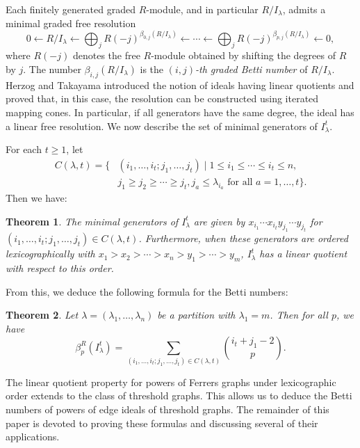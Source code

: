 \documentclass[12pt,amscd]{amsart}
\newtheorem{thm}{Theorem}[section]
\theoremstyle{definition}
\numberwithin{equation}{section}
\begin{document}
Each finitely generated graded $R$-module, and in particular $R/I_\lambda$, admits a minimal graded free resolution
\[
    0 \leftarrow R/I_\lambda \leftarrow \bigoplus_{j} R(-j)^{\beta_{0,j}(R/I_\lambda)} \leftarrow \cdots \leftarrow \bigoplus_{j} R(-j)^{\beta_{p,j}(R/I_\lambda)} \leftarrow 0,
\]
where $R(-j)$ denotes the free $R$-module obtained by shifting the degrees of $R$ by $j$. The number $\beta_{i,j}(R/I_\lambda)$ is the \emph{$(i,j)$-th graded Betti number} of $R/I_\lambda$. Herzog and Takayama \cite{HT} introduced the notion of ideals having linear quotients and proved that, in this case, the resolution can be constructed using iterated mapping cones. In particular, if all generators have the same degree, the ideal has a linear free resolution. We now describe the set of minimal generators of $I_\lambda^t$. 

For each $t \ge 1$, let 
$$
\begin{aligned}
C(\lambda,t) = \{ &(i_1, \ldots, i_t; j_1, \ldots, j_t) \mid 1 \le i_1 \le \cdots \le i_t \le n, \\
&j_1 \ge j_2 \ge \cdots \ge j_t, j_a \le \lambda_{i_a} \text{ for all } a = 1, \ldots, t \}.
\end{aligned}
$$
Then we have:

\begin{thm}\label{thm_linearquotient}
    The minimal generators of $I_\lambda^t$ are given by $x_{i_1} \cdots x_{i_t} y_{j_1} \cdots y_{j_t}$ for $(i_1, \ldots, i_t; j_1, \ldots, j_t) \in C(\lambda,t)$. Furthermore, when these generators are ordered lexicographically with $x_1 > x_2 > \cdots > x_n > y_1 > \cdots > y_m$, $I_\lambda^t$ has a linear quotient with respect to this order.
\end{thm}

From this, we deduce the following formula for the Betti numbers:

\begin{thm}\label{thm_betti} 
    Let $\lambda = (\lambda_1, \ldots, \lambda_n)$ be a partition with $\lambda_1 = m$. Then for all $p$, we have 
    $$\beta_p^R(I_\lambda^t) = \sum_{(i_1, \ldots, i_t; j_1, \ldots, j_t) \in C(\lambda,t)} \binom{i_t + j_1 - 2}{p}.$$
\end{thm}

The linear quotient property for powers of Ferrers graphs under lexicographic order extends to the class of threshold graphs. This allows us to deduce the Betti numbers of powers of edge ideals of threshold graphs. The remainder of this paper is devoted to proving these formulas and discussing several of their applications.
\end{document}
